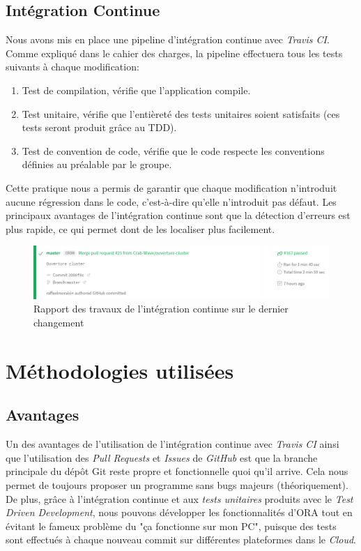 \documentclass[11pt, a4paper]{report}
\begin{document}
    \subsection{Intégration Continue}
      Nous avons mis en place une pipeline d'intégration continue avec \textit{Travis CI}.
      Comme expliqué dans le cahier des charges, la pipeline effectuera tous les tests suivants à chaque modification:
      \begin{enumerate}
        \item Test de compilation, vérifie que l'application compile.
        \item Test unitaire, vérifie que l'entièreté des tests unitaires soient satisfaits (ces tests seront produit grâce au TDD).
        \item Test de convention de code, vérifie que le code respecte les conventions définies au préalable par le groupe.
      \end{enumerate}
      \bigbreak
      Cette pratique nous a permis de garantir que chaque modification n'introduit aucune régression dans le code, c’est-à-dire qu’elle n'introduit pas défaut. Les principaux avantages de l’intégration continue sont que la détection d’erreurs est plus rapide, ce qui permet dont de les localiser plus facilement.
      \begin{figure}[H]
        \centering
        \includegraphics[width=17cm]{assets/presentation1/travis.png}
        \caption{Rapport des travaux de l'intégration continue sur le dernier changement}
      \end{figure}

    \clearpage
      
  \section{Méthodologies utilisées}

    \subsection{Avantages}
      Un des avantages de l'utilisation de l'intégration continue avec \textit{Travis CI} ainsi que l'utilisation des \textit{Pull Requests} et \textit{Issues} de \textit{GitHub} est que la branche principale du dépôt Git reste propre et fonctionnelle quoi qu'il arrive. Cela nous permet de toujours proposer un programme sans bugs majeurs (théoriquement).
      De plus, grâce à l'intégration continue et aux \textit{tests unitaires} produits avec le \textit{Test Driven Development}, nous pouvons développer les fonctionnalités d'ORA tout en évitant le fameux problème du "ça fonctionne sur mon PC", puisque des tests sont effectués à chaque nouveau commit sur différentes plateformes dans le \textit{Cloud}.
\end{document}
